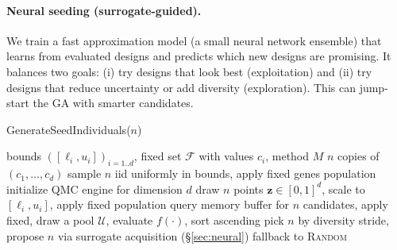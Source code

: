 \documentclass[12pt,a4paper]{article}
\begin{document}
\paragraph{Neural seeding (surrogate-guided).}
We train a fast approximation model (a small neural network ensemble) that learns from evaluated designs and predicts which new designs are promising. It balances two goals: (i) try designs that look best (exploitation) and (ii) try designs that reduce uncertainty or add diversity (exploration). This can jump-start the GA with smarter candidates.

\begin{algorithm}[H]
\caption{GenerateSeedIndividuals($n$)}
\begin{algorithmic}[1]
\Require bounds $([\ell_i,u_i])_{i=1..d}$, fixed set $\mathcal{F}$ with values $c_i$, method $M$
 \State \Return $n$ copies of $(c_1,\ldots,c_d)$ \EndIf
{} \State sample $n$ iid uniformly in bounds, apply fixed genes \State \Return population \EndIf
{}
\State initialize QMC engine for dimension $d$
\State draw $n$ points $\bm{z}\in[0,1]^d$, scale to $[\ell_i,u_i]$, apply fixed
\State \Return population
\State query memory buffer for $n$ candidates, apply fixed, \Return
{}
\State draw a pool $\mathcal{U}$, evaluate $f(\cdot)$, sort ascending
\State pick $n$ by diversity stride, \Return
{}
\State propose $n$ via surrogate acquisition (\S\ref{sec:neural})
\State \Return
\Else \State fallback to \textsc{Random}
\EndIf
\end{algorithmic}
\end{algorithm}
\end{document}
